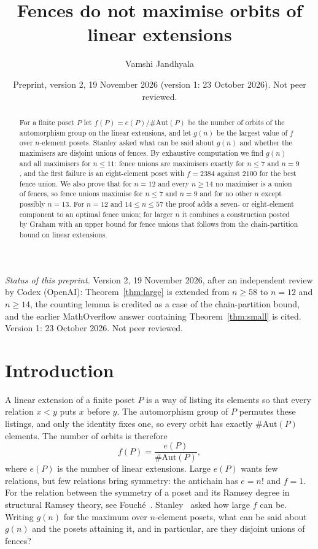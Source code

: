\documentclass[11pt]{amsart}
\title[Fences and orbits of linear extensions]{Fences do not maximise orbits of linear extensions}
\author{Vamshi Jandhyala}
\date{Preprint, version 2, 19 November 2026 (version 1: 23 October 2026). Not peer reviewed.}
\theoremstyle{remark}
\begin{document}
\begin{abstract}
For a finite poset $P$ let $f(P)=e(P)/\#\mathrm{Aut}(P)$ be the number of orbits of the automorphism group on the linear extensions, and let $g(n)$ be the largest value of $f$ over $n$-element posets. Stanley asked what can be said about $g(n)$ and whether the maximisers are disjoint unions of fences. By exhaustive computation we find $g(n)$ and all maximisers for $n\le11$: fence unions are maximisers exactly for $n\le7$ and $n=9$, and the first failure is an eight-element poset with $f=2384$ against $2100$ for the best fence union. We also prove that for $n=12$ and every $n\ge14$ no maximiser is a union of fences, so fence unions maximise for $n\le7$ and $n=9$ and for no other $n$ except possibly $n=13$. For $n=12$ and $14\le n\le57$ the proof adds a seven- or eight-element component to an optimal fence union; for larger $n$ it combines a construction posted by Graham with an upper bound for fence unions that follows from the chain-partition bound on linear extensions.
\end{abstract}

\maketitle

\noindent\emph{Status of this preprint.} Version 2, 19 November 2026, after an independent review by Codex (OpenAI): Theorem~\ref{thm:large} is extended from $n\ge58$ to $n=12$ and $n\ge14$, the counting lemma is credited as a case of the chain-partition bound, and the earlier MathOverflow answer containing Theorem~\ref{thm:small} is cited. Version 1: 23 October 2026. Not peer reviewed.

\section{Introduction}

A linear extension of a finite poset $P$ is a way of listing its elements so that every relation $x<y$ puts $x$ before $y$. The automorphism group of $P$ permutes these listings, and only the identity fixes one, so every orbit has exactly $\#\mathrm{Aut}(P)$ elements. The number of orbits is therefore
\[
f(P)=\frac{e(P)}{\#\mathrm{Aut}(P)},
\]
where $e(P)$ is the number of linear extensions. Large $e(P)$ wants few relations, but few relations bring symmetry: the antichain has $e=n!$ and $f=1$. For the relation between the symmetry of a poset and its Ramsey degree in structural Ramsey theory, see Fouch\'e~\cite{Fo}. Stanley~\cite{MO} asked how large $f$ can be. Writing $g(n)$ for the maximum over $n$-element posets, what can be said about $g(n)$ and the posets attaining it, and in particular, are they disjoint unions of fences?
\end{document}
